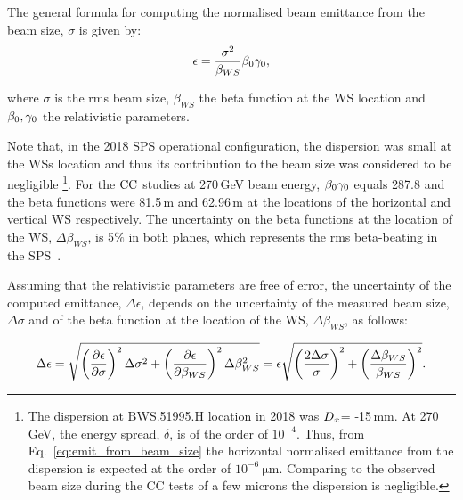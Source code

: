 The general formula for computing the normalised beam emittance from the beam size, $\sigma$ is given by:
\begin{equation}\label{eq:emittance_from_WS}
   \centering
   \epsilon = \frac{\sigma^2}{\beta_{WS}} \betarel \gammarel ,
\end{equation}

where $\sigma$ is the rms beam size, $\beta_{WS}$ the beta function at the WS location and ${\beta_0}, {\gamma_0}$ the relativistic parameters.


Note that, in the 2018 SPS operational configuration, the dispersion was small at the WSs location and thus its contribution to the beam size was considered to be negligible \footnote{The dispersion at BWS.51995.H location in 2018 was ${D_x}$= -15\,mm. At 270\,GeV, the energy spread, $\delta$, is of the order of $\mathrm{10^{-4}}$. Thus, from Eq.~\eqref{eq:emit_from_beam_size} the horizontal normalised emittance from the dispersion is expected at the order of $\mathrm{10^{-6} \ \mu m}$. Comparing to the observed beam size during the CC tests of a few microns the dispersion is negligible. \color{red}{The measured $\Dx, \Dy$ were found to be very small and thus their contribution is also considered negligible. The plan is to perform some measurments in 2022 to get a feeling of their values at the location of the wire scanners}}. For the ${\mathrm{CC}}$ studies at 270\,GeV beam energy, ${\beta_0} {\gamma_0}$ equals 287.8 and the beta functions were 81.5\,m and 62.96\,m at the locations of the horizontal and vertical WS respectively. The uncertainty on the beta functions at the location of the WS, $\Delta \beta_{WS}$, is 5$\%$ in both planes, which represents the rms beta-beating in the SPS~\cite{SPS-beta-beating-Rogelio}.

Assuming that the relativistic parameters are free of error, the uncertainty of the computed emittance, $\Delta \epsilon$, depends on the uncertainty of the measured beam size, $\Delta \sigma$ and of the beta function at the location of the WS, $\Delta \beta_{WS}$, as follows:

\begin{equation}\label{eq:emittance_from_WS_uncertainty}
   \centering
   \Delta \epsilon = \sqrt{\left ( \frac{\partial \epsilon}{\partial \sigma}\right )^2 \Delta \sigma^2 + \left ( \frac{\partial \epsilon}{\partial \beta_{WS}} \right )^2 \Delta \beta_{WS}^2} = \epsilon  \sqrt{\left ( \frac{2 \Delta \sigma}{\sigma}\right )^2 + \left ( \frac{ \Delta \beta_{WS}}{\beta_{WS}} \right )^2} .
\end{equation}

